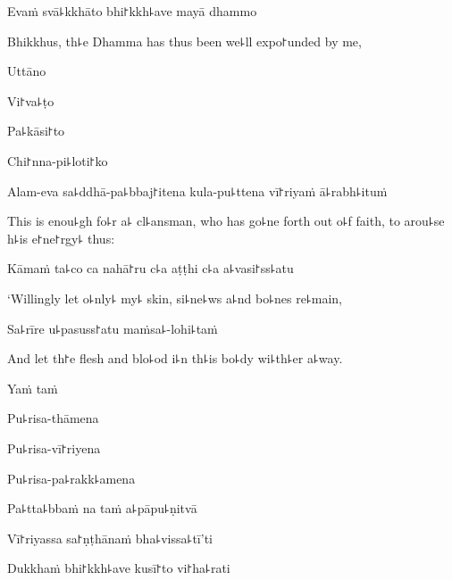 Evaṁ svā꜕kkhāto bhi꜓kkh꜕ave mayā dhammo

\begin{english}
  Bhikkhus, th꜕e Dhamma has thus been we꜕ll expo꜓unded by me,
\end{english}

Uttāno


Vi꜓va꜕ṭo


Pa꜕kāsi꜓to


Chi꜓nna-pi꜕loti꜓ko


Alam-eva sa꜕ddhā-pa꜕bbaj꜓itena kula-pu꜕ttena vī꜓riyaṁ ā꜕rabh꜕ituṁ

\begin{english}
  This is enou꜕gh fo꜕r a꜕ cl꜕ansman, who has go꜕ne forth out o꜕f faith,
  to arou꜕se h꜕is e꜓ne꜓rgy꜕ thus:
\end{english}

Kāmaṁ ta꜕co ca nahā꜓ru c꜕a aṭṭhi c꜕a a꜕vasi꜓ss꜕atu

\begin{english}
  `Willingly let o꜕nly꜕ my꜕ skin, si꜕ne꜕ws a꜕nd bo꜕nes re꜕main,
\end{english}

Sa꜕rīre u꜕pasuss꜓atu maṁsa꜕-lohi꜕taṁ

\begin{english}
  And let th꜓e flesh and blo꜕od i꜕n th꜕is bo꜕dy wi꜕th꜕er a꜕way.
\end{english}

Yaṁ taṁ


Pu꜕risa-thāmena


Pu꜕risa-vī꜓riyena


Pu꜕risa-pa꜕rakk꜕amena


Pa꜕tta꜕bbaṁ na taṁ a꜕pāpu꜕ṇitvā


Vī꜓riyassa sa꜓ṇṭhānaṁ bha꜕vissa꜕tī'ti


Dukkhaṁ bhi꜓kkh꜕ave kusī꜓to vi꜓ha꜕rati

